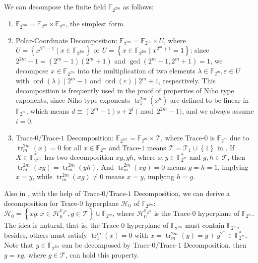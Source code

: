 \documentclass[12pt,a4paper]{ctexbook}
\newcommand{\0}{\textbf{0}}
\newcommand{\1}{\textbf{1}}
\newcommand{\F}{\mathbb{F}}
\newcommand{\ord}{\operatorname{ord}}
\begin{document}
    We can decompose the finite field $ \F_{2^{2m}} $ as follows:
    \begin{enumerate}[label=(\arabic{*})]
        \item $ \F_{2^{2m}}=\F_{2^m}\times\F_{2^m} $, the simplest form.
        \item Polar-Coordinate Decomposition: $ \F_{2^{2m}}=\F_{2^m}\times U $, 
        where $ U=\left\{ x^{2^m-1}\mid x\in\F_{2^{2m}}\right\} $ 
        or $ U=\left\{ x\in\F_{2^{2m}}\mid x^{2^m+1}=1 \right\} $: 
        since $ 2^{2m}-1=(2^m-1)(2^m+1) $ and $ \gcd(2^m-1,2^m+1)=1 $, 
        we decompose $ x\in\F_{2^{2m}} $ into the multiplication of two elements $ \lambda\in\F_{2^m},\varepsilon\in U $ 
        with $ \ord(\lambda)\mid 2^m-1 $ and $ \ord(\varepsilon)\mid 2^m+1 $, respectively. 
        This decomposition is frequently used in the proof of properties of Niho type exponents, 
        since Niho type exponents $ \operatorname{tr}_1^{2m}(x^d) $ are defined to be linear in $ \F_{2^m} $, 
        which means $ d\equiv (2^m-1)s+2^i\pmod{2^{2m}-1} $, and we always assume $ i=0 $. 
        \item Trace-$ 0 $/Trace-$ 1 $ Decomposition: $ \F_{2^{2m}}=\F_{2^m}\times\mathcal{T} $, 
        where Trace-$ 0 $ is $ \F_{2^m} $ due to $ \operatorname{tr}_m^{2m}(x)=0 $ for all $ x\in\F_{2^m} $ and 
        Trace-$ 1 $ means $ \mathcal{T}=\mathcal{T}_1\cup\left\{ 1 \right\} $ in \cite{gologlu2019proofconjecture}. 
        If $ X\in\F_{2^{2m}}^* $ has two decomposition $ xg,yh $, where $ x,y\in\F_{2^m}^* $ and $ g,h\in\mathcal{T} $, 
        then $ \operatorname{tr}_m^{2m}(xg)=\operatorname{tr}_m^{2m}(yh) $. And $ \operatorname{tr}_m^{2m}(xg)=0 $ means $ g=h=1 $, implying $ x=y $, while $ \operatorname{tr}_m^{2m}(xg)\ne 0 $ means $ x=y $, implying $ h=g $. 
    \end{enumerate} 
    Also in \cite{gologlu2019proofconjecture},  with the help of Trace-$ 0 $/Trace-$ 1 $ Decomposition, 
    we can derive a decomposition for Trace-$ 0 $ hyperplane $ \mathcal{H}_0 $ of $ \F_{2^{2m}} $: 
    $ \mathcal{H}_0=\left\{ xg:x\in\mathcal{H}_0^{\F_{2^m}},g\in\mathcal{T} \right\}\cup\F_{2^m} $, 
    where $ \mathcal{H}_0^{\F_{2^m}} $ is the Trace-$ 0 $ hyperplane of $ \F_{2^m} $. 
    The idea is natural, that is, the Trace-$ 0 $ hyperplane of $ \F_{2^{2m}} $ must contain $ \F_{2^m} $, 
    besides, others must satisfy $ \operatorname{tr}_1^m(x)=0 $ with $ x=\operatorname{tr}_m^{2m}(y)=y+y^{2^m}\in\F_{2^m}^* $. 
    Note that $ y\in\F_{2^{2m}} $ can be decomposed by Trace-$ 0 $/Trace-$ 1 $ Decomposition, then $ y=xg $,  
    where $ g\in\mathcal{T} $, can hold this property.
\end{document}
